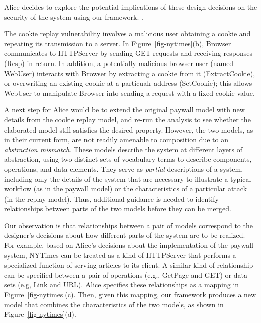 Alice decides to explore the potential implications of these design
decisions on the security of the system using our framework. .

The cookie replay vulnerability involves a malicious user obtaining a
cookie and repeating its transmission to a server.  In
Figure~\ref{fig-nytimes}(b), \textsf{Browser} communicates to
\textsf{HTTPServer} by sending \textsf{GET} requests and receiving
responses (\textsf{Resp}) in return. In addition, a potentially
malicious browser user (named \textsf{WebUser}) interacts with
\textsf{Browser} by extracting a cookie from it
(\textsf{ExtractCookie}), or overwriting an existing cookie at a
particualr address (\textsf{SetCookie}); this allows \textsf{WebUser}
to manipulate \textsf{Browser} into sending a request with a fixed
cookie value.

A next step for Alice would be to extend the original paywall model
with new details from the cookie replay model, and re-run the analysis
to see whether the elaborated model still satisfies the desired
property. However, the two models, as in their current form, are not
readily amenable to composition due to an \textit{abstraction
  mismatch}. These models describe the system at different layers of
abstraction, using two distinct sets of vocabulary terms to describe
components, operations, and data elements. They serve as \textit{partial}
descriptions of a system, including only the details of the system
that are necessary to illustrate a typical workflow (as in the paywall
model) or the characteristics of a particular attack (in the replay
model). Thus, additional guidance is needed to identify relationships
between parts of the two models before they can be merged.

Our observation is that relationships between a pair of models
correspond to the designer's decisions about how different parts of
the system are to be realized. For example, based on Alice's decisions
about the implementation of the paywall system, \textsf{NYTimes} can
be treated as a kind of \textsf{HTTPServer} that performs a
specialized function of serving articles to its client. A similar kind
of relationship can be specified between a pair of operations (e.g.,
\textsf{GetPage} and \textsf{GET}) or data sets (e.g, \textsf{Link}
and \textsf{URL}). Alice specifies these relationships as a mapping in
Figure~\ref{fig-nytimes}(c). Then, given this mapping, our framework
produces a new model that combines the characteristics of the two
models, as shown in Figure~\ref{fig-nytimes}(d).

